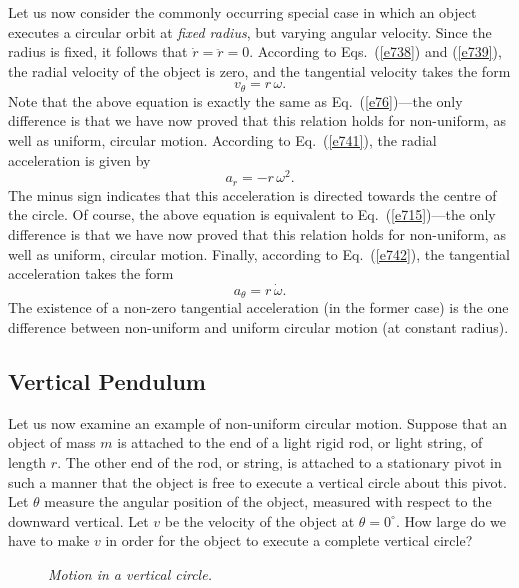 Let us now consider the commonly occurring special case in which an object executes a circular
orbit at {\em fixed radius}, but varying angular velocity. Since the radius is fixed, it follows
that $\dot{r}=\ddot{r}=0$. According to Eqs.~(\ref{e738}) and (\ref{e739}), the radial
velocity of the object is zero, and the tangential velocity takes the form
\begin{equation}
v_\theta = r\,\omega.
\end{equation}
Note that the above equation is exactly the same as Eq.~(\ref{e76})---the only difference
is that we have now proved that this relation holds for non-uniform, as well as uniform,
circular motion.
According to Eq.~(\ref{e741}), the radial acceleration is given by
\begin{equation}
a_r = -r\,\omega^2.
\end{equation}
The minus sign indicates that this acceleration is directed towards the centre of the
circle. Of course, the above equation is equivalent to Eq.~(\ref{e715})---the only difference
is that we have now proved that this relation holds for non-uniform, as well as uniform,
circular motion. Finally, according to Eq.~(\ref{e742}), the tangential acceleration
takes the form
\begin{equation}
a_\theta = r\,\dot{\omega}.
\end{equation}
The existence of a non-zero tangential acceleration (in the former case) is the one difference between
non-uniform and uniform circular motion (at constant radius).

\subsection{Vertical Pendulum}
Let us now examine an example of non-uniform circular motion. 
Suppose that an object of mass $m$ is attached to the end of a light rigid rod, or light string, of length
$r$. The other end of the rod, or string, is attached to a stationary pivot
 in such a manner that the object is free to execute a vertical circle about this pivot. Let $\theta$
measure the angular position of the object, measured with
respect to the downward vertical. Let $v$ be the velocity of the object at $\theta=0^\circ$.
 How large do we have to make $v$ in order for the object to execute a complete
vertical circle?

\begin{figure}
\epsfysize=3in
\centerline{}
\caption{\em Motion in a vertical circle.}\label{f65}  
\end{figure}

